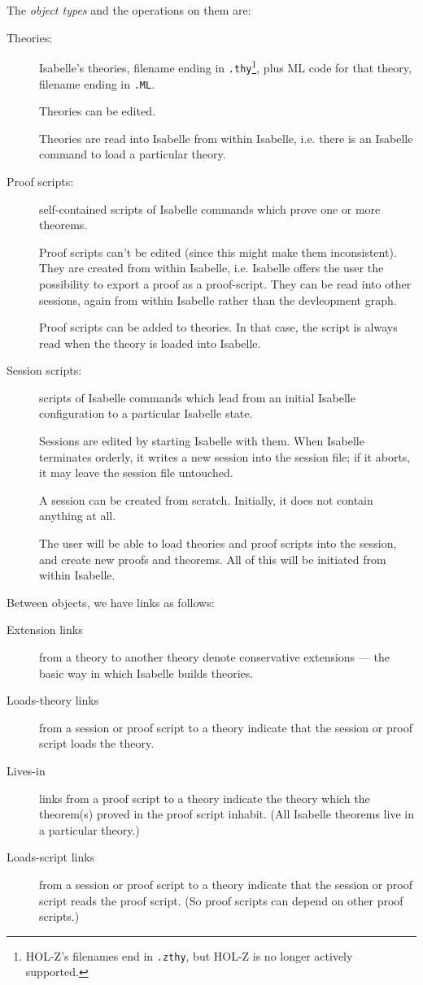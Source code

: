 \documentclass[a4paper]{article}
\begin{document}
The \emph{object types} and the operations on them are:
\begin{description}
\item[Theories:] Isabelle's theories, filename ending in
  \texttt{.thy}\footnote{HOL-Z's filenames end in \texttt{.zthy}, but
    HOL-Z is no longer actively supported.},
  plus ML code for that theory, filename ending in \texttt{.ML}. 
  
  Theories can be edited.
  
  Theories are read into Isabelle from within Isabelle, i.e. there is
  an Isabelle command to load a particular theory.

\item[Proof scripts:] self-contained scripts of Isabelle commands which 
  prove one or more theorems. 
  
  Proof scripts can't be edited (since this might make them
  inconsistent). They are created from within Isabelle, i.e. Isabelle
  offers the user the possibility to export a proof as a proof-script.
  They can be read into other sessions, again from within Isabelle
  rather than the devleopment graph.

  Proof scripts can be added to theories. In that case, the script is
  always read when the theory is loaded into Isabelle.

\item[Session scripts:] scripts of Isabelle commands which lead from an
  initial Isabelle configuration to a particular Isabelle state.  
  
  Sessions are edited by starting Isabelle with them. When Isabelle
  terminates orderly, it writes a new session into the session file;
  if it aborts, it may leave the session file untouched.

  A session can be created from scratch. Initially, it does not
  contain anything at all. 
  
  The user will be able to load theories and proof scripts into the
  session, and create new proofs and theorems.  All of this will be
  initiated from within Isabelle.
\end{description}


Between objects, we have links as follows:
\begin{description}
\item[Extension links] from a theory to another theory denote
  conservative extensions --- the basic way in which Isabelle builds
  theories.
\item[Loads-theory links] from a session or proof script to a theory
  indicate that the  session or proof script loads the theory. 
\item[Lives-in] links from a proof script to a theory indicate the
  theory which the theorem(s) proved in the proof script inhabit. (All 
  Isabelle theorems live in a particular theory.) 
\item[Loads-script links] from a session or proof script to a theory
  indicate that the session or proof script reads the proof
  script. (So proof scripts can depend on other proof scripts.)
\end{description}
\end{document}

